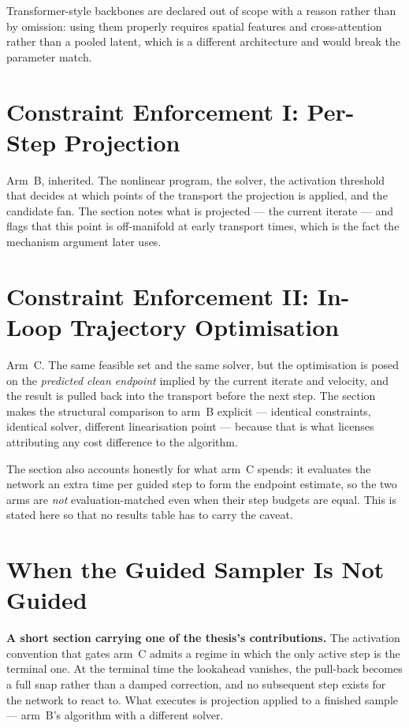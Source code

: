 \documentclass[headsepline,footsepline,footinclude=false,oneside,fontsize=11pt,paper=a4,listof=totoc,bibliography=totoc]{scrbook}
\begin{document}
Transformer-style backbones are declared out of scope with a reason rather than by omission:
using them properly requires spatial features and cross-attention rather than a pooled
latent, which is a different architecture and would break the parameter match.

\section{Constraint Enforcement I: Per-Step Projection}\label{sec:method:proj}

Arm~B, inherited. The nonlinear program, the solver, the activation threshold that decides
at which points of the transport the projection is applied, and the candidate fan. The
section notes what is projected --- the current iterate --- and flags that this point is
off-manifold at early transport times, which is the fact the mechanism argument later uses.

\section{Constraint Enforcement II: In-Loop Trajectory Optimisation}\label{sec:method:hardflow}

Arm~C. The same feasible set and the same solver, but the optimisation is posed on the
\emph{predicted clean endpoint} implied by the current iterate and velocity, and the result
is pulled back into the transport before the next step. The section makes the structural
comparison to arm~B explicit --- identical constraints, identical solver, different
linearisation point --- because that is what licenses attributing any cost difference to the
algorithm.

The section also accounts honestly for what arm~C spends: it evaluates the network an extra
time per guided step to form the endpoint estimate, so the two arms are \emph{not}
evaluation-matched even when their step budgets are equal. This is stated here so that no
results table has to carry the caveat.

\section{When the Guided Sampler Is Not Guided}\label{sec:method:degenerate}

\textbf{A short section carrying one of the thesis's contributions.} The activation
convention that gates arm~C admits a regime in which the only active step is the terminal
one. At the terminal time the lookahead vanishes, the pull-back becomes a full snap rather
than a damped correction, and no subsequent step exists for the network to react to. What
executes is projection applied to a finished sample --- arm~B's algorithm with a different
solver.
\end{document}
